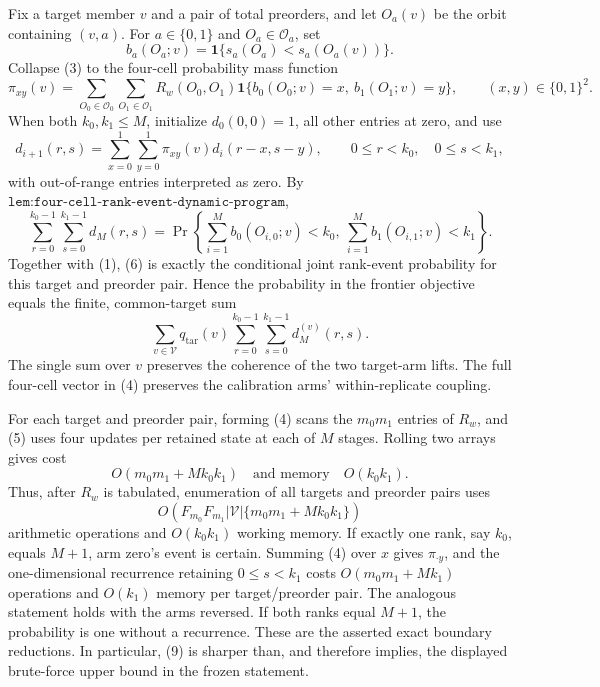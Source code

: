 Fix a target member \(v\) and a pair of total preorders, and let \(O_a(v)\) be the orbit containing \((v,a)\). For \(a\in\{0,1\}\) and \(O_a\in\mathcal O_a\), set
\[
b_a(O_a;v)=\mathbf 1\{s_a(O_a)<s_a(O_a(v))\}.
\]
Collapse (3) to the four-cell probability mass function
\[
\pi_{xy}(v)=\sum_{O_0\in\mathcal O_0}\sum_{O_1\in\mathcal O_1}R_w(O_0,O_1)\mathbf 1\{b_0(O_0;v)=x,\ b_1(O_1;v)=y\},
\qquad (x,y)\in\{0,1\}^2.
\tag{4}
\]
When both \(k_0,k_1\le M\), initialize \(d_0(0,0)=1\), all other entries at zero, and use
\[
d_{i+1}(r,s)=\sum_{x=0}^1\sum_{y=0}^1\pi_{xy}(v)d_i(r-x,s-y),
\qquad 0\le r<k_0,\quad 0\le s<k_1,
\tag{5}
\]
with out-of-range entries interpreted as zero. By \(\texttt{lem:four-cell-rank-event-dynamic-program}\),
\[
\sum_{r=0}^{k_0-1}\sum_{s=0}^{k_1-1}d_M(r,s)
=\Pr\!\left\{\sum_{i=1}^M b_0(O_{i,0};v)<k_0,\ \sum_{i=1}^M b_1(O_{i,1};v)<k_1\right\}.
\tag{6}
\]
Together with (1), (6) is exactly the conditional joint rank-event probability for this target and preorder pair. Hence the probability in the frontier objective equals the finite, common-target sum
\[
\sum_{v\in\mathcal V}q_{\mathrm{tar}}(v)\sum_{r=0}^{k_0-1}\sum_{s=0}^{k_1-1}d_M^{(v)}(r,s).
\tag{7}
\]
The single sum over \(v\) preserves the coherence of the two target-arm lifts. The full four-cell vector in (4) preserves the calibration arms' within-replicate coupling.

For each target and preorder pair, forming (4) scans the \(m_0m_1\) entries of \(R_w\), and (5) uses four updates per retained state at each of \(M\) stages. Rolling two arrays gives cost
\[
O(m_0m_1+Mk_0k_1)
\quad\text{and memory}\quad O(k_0k_1).
\tag{8}
\]
Thus, after \(R_w\) is tabulated, enumeration of all targets and preorder pairs uses
\[
O\!\left(F_{m_0}F_{m_1}|\mathcal V|\{m_0m_1+Mk_0k_1\}\right)
\tag{9}
\]
arithmetic operations and \(O(k_0k_1)\) working memory. If exactly one rank, say \(k_0\), equals \(M+1\), arm zero's event is certain. Summing (4) over \(x\) gives \(\pi_{\cdot y}\), and the one-dimensional recurrence retaining \(0\le s<k_1\) costs \(O(m_0m_1+Mk_1)\) operations and \(O(k_1)\) memory per target/preorder pair. The analogous statement holds with the arms reversed. If both ranks equal \(M+1\), the probability is one without a recurrence. These are the asserted exact boundary reductions. In particular, (9) is sharper than, and therefore implies, the displayed brute-force upper bound in the frozen statement.

